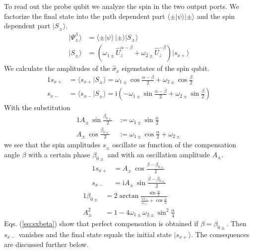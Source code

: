 \documentclass[english,keywords,aps,twocolumn]{revtex4-1}
\newcommand{\im}{\text{i}}
\begin{document}
To read out the probe qubit we analyze the spin %
in the two output ports. We factorize the final state into the path dependent part $\langle\pm | \psi\rangle |\pm\rangle$ and the spin dependent part $|S_\pm\rangle$.
\begin{subequations}
\begin{alignat}{1}
  |\mathit\Psi_\pm^\beta\rangle &= \langle\pm | \psi\rangle \, |\pm\rangle |S_\pm\rangle \\
  |S_\pm\rangle&= \left(\omega_{1\pm} \hat U_z^{\alpha-\beta} +  \omega_{2\pm} \hat U_z^{-\beta} \right)| s_{x+}\rangle
\end{alignat}
\end{subequations}
We calculate the amplitudes of the $\hat\sigma_x$ eigenstates of the spin qubit.
\begin{alignat}{1}
  s_{x+}&= \langle s_{x+}|S_\pm\rangle
 =\omega_{1\pm} \cos \frac {\alpha-\beta} 2 + \omega_{2\pm} \cos \frac {\beta} 2\label{eq:sxplus}\nonumber\\
 s_{x-}&=  \langle s_{x-}|S_\pm\rangle
   = \im \left(-\omega_{1\pm} \sin \frac {\alpha-\beta} 2 + \omega_{2\pm} \sin \frac {\beta} 2\right) 
\end{alignat}
With the substitution
\begin{alignat}{1}
  A_\pm\, \sin\frac{\beta_{0\pm}}2 &:=  \omega_{1\pm} \sin\frac\alpha 2 \nonumber\\
  A_\pm \,\cos\frac{\beta_{0\pm}}2 &:= \omega_{1\pm} \cos\frac\alpha 2 + \omega_{2\pm}
\end{alignat}
we see that the spin amplitudes $s_\pm$ oscillate as function of the compensation angle $\beta$ with a certain phase $\beta_{0\pm}$ and with an oscillation amplitude $A_\pm$.
\begin{alignat}{1}
  s_{x+} &= A_\pm \, \cos \frac{\beta - \beta_{0\pm}}2 \nonumber\\
  s_{x-} &= \im A_\pm \, \sin \frac{\beta - \beta_{0\pm}}2 \label{eq:sxbeta}
\end{alignat}
\begin{alignat}{1}
  \beta_{0\pm} &= 2 \arctan \frac{\sin \frac \alpha 2}{\frac {\omega_{2\pm}}{\omega_{1\pm}} + \cos \frac \alpha 2 } \label{eq:beta0pm}\\
  A_\pm^2 &= 1-4 \omega_{1\pm} \omega_{2\pm} \sin^2 \frac\alpha 4 \label{eq:Apm}
\end{alignat}
Eqs. (\ref{eq:sxbeta}) show that perfect compensation is obtained if $\beta = \beta_{0\pm}$. Then $s_{x-}$ vanishes and the final state equals the initial state $|s_{x+}\rangle$. The consequences are discussed further below.
\end{document}

